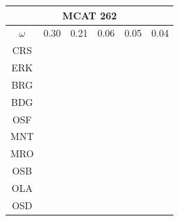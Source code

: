 \documentclass[12pt]{article}
\begin{document}
\begin{landscape}
\begin{figure}
\begin{minipage}[c]{0.3\textwidth}
\begin{tabular}{|c|c|c|c|c|c|}
         \hline \multicolumn{6}{|c|}{MCAT 262} \\ \hline                                                                              
         $\omega$&0.30&0.21&0.06&0.05&0.04 \\ \hline                                                                                  
        CRS&\cellcolor[HTML]{E41A1C}&\cellcolor[HTML]{E41A1C}&\cellcolor[HTML]{E41A1C}&\cellcolor[HTML]{E41A1C}&\cellcolor[HTML]{E41A1C} \\ \hline
        ERK&\cellcolor[HTML]{E41A1C}&\cellcolor[HTML]{E41A1C}&\cellcolor[HTML]{E41A1C}&\cellcolor[HTML]{E41A1C}&\cellcolor[HTML]{E41A1C} \\ \hline
        BRG&\cellcolor[HTML]{E41A1C}&\cellcolor[HTML]{E41A1C}&\cellcolor[HTML]{377EB8}&\cellcolor[HTML]{E41A1C}&\cellcolor[HTML]{E41A1C} \\ \hline
        BDG&\cellcolor[HTML]{377EB8}&\cellcolor[HTML]{377EB8}&\cellcolor[HTML]{377EB8}&\cellcolor[HTML]{377EB8}&\cellcolor[HTML]{377EB8} \\ \hline
        OSF&\cellcolor[HTML]{377EB8}&\cellcolor[HTML]{377EB8}&\cellcolor[HTML]{377EB8}&\cellcolor[HTML]{4DAF4A}&\cellcolor[HTML]{4DAF4A} \\ \hline
        MNT&\cellcolor[HTML]{377EB8}&\cellcolor[HTML]{377EB8}&\cellcolor[HTML]{4DAF4A}&\cellcolor[HTML]{4DAF4A}&\cellcolor[HTML]{4DAF4A} \\ \hline
        MRO&\cellcolor[HTML]{4DAF4A}&\cellcolor[HTML]{4DAF4A}&\cellcolor[HTML]{4DAF4A}&\cellcolor[HTML]{984EA3}&\cellcolor[HTML]{984EA3} \\ \hline
        OSB&\cellcolor[HTML]{984EA3}&\cellcolor[HTML]{984EA3}&\cellcolor[HTML]{984EA3}&\cellcolor[HTML]{984EA3}&\cellcolor[HTML]{FF7F00} \\ \hline
        OLA&\cellcolor[HTML]{984EA3}&\cellcolor[HTML]{FF7F00}&\cellcolor[HTML]{984EA3}&\cellcolor[HTML]{FF7F00}&\cellcolor[HTML]{FFFF33} \\ \hline
        OSD&\cellcolor[HTML]{FF7F00}&\cellcolor[HTML]{FF7F00}&\cellcolor[HTML]{984EA3}&\cellcolor[HTML]{FFFF33}&\cellcolor[HTML]{A65628} \\ \hline
\end{tabular}
\end{minipage}
\begin{minipage}[c]{0.3\textwidth}                                                                                                                         
\begin{tabular}{|c|c|c|c|c|c|}                                                                                                        

\end{tabular}
\end{minipage}
\end{figure}
\end{landscape}
\end{document}

